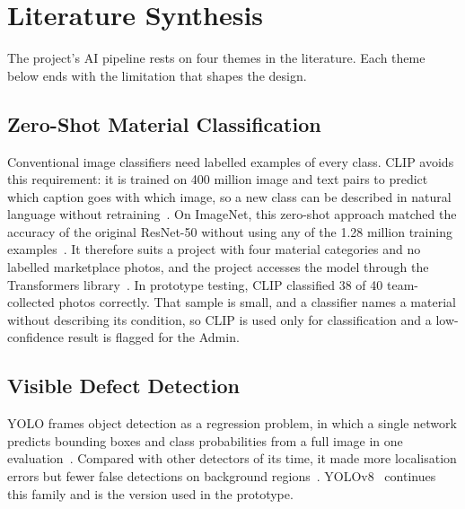 \section{Literature Synthesis }
The project's AI pipeline rests on four themes in the literature. Each theme below
ends with the limitation that shapes the design.

\subsection{Zero-Shot Material Classification}
Conventional image classifiers need labelled examples of every class. CLIP avoids
this requirement: it is trained on 400 million image and text pairs to predict which
caption goes with which image, so a new class can be described in natural language
without retraining~\citep{radford2021clip}. On ImageNet, this zero-shot approach matched
the accuracy of the original ResNet-50 without using any of the 1.28 million training
examples~\citep{radford2021clip}. It therefore suits a project with four material
categories and no labelled marketplace photos, and the project accesses the model through the
Transformers library~\citep{wolf2020transformers}. In prototype testing, CLIP classified
38 of 40 team-collected photos correctly. That sample is small, and a classifier names a
material without describing its condition, so CLIP is used only for classification and a
low-confidence result is flagged for the Admin.

\subsection{Visible Defect Detection}
YOLO frames object detection as a regression problem, in which a single network predicts
bounding boxes and class probabilities from a full image in one
evaluation~\citep{redmon2016yolo}. Compared with other detectors of its time, it made
more localisation errors but fewer false detections on background
regions~\citep{redmon2016yolo}. YOLOv8~\citep{jocher2023yolov8} continues this family and
is the version used in the prototype.

